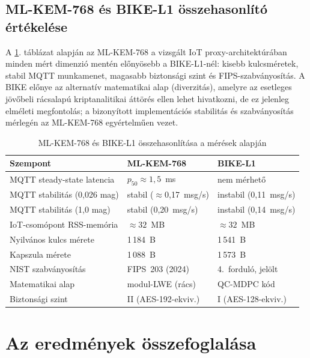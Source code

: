 \subsection{ML-KEM-768 és BIKE-L1 összehasonlító értékelése}

A \ref{tab:comparison}. táblázat alapján az ML-KEM-768 a vizsgált IoT proxy-architektúrában minden mért dimenzió
mentén előnyösebb a BIKE-L1-nél: kisebb kulcsméretek, stabil MQTT munkamenet, magasabb
biztonsági szint és FIPS-szabványosítás. A BIKE előnye az alternatív matematikai alap
(diverzitás), amelyre az esetleges jövőbeli rácsalapú kriptanalitikai áttörés ellen lehet
hivatkozni, de ez jelenleg elméleti megfontolás; a bizonyított implementációs stabilitás
és szabványosítás mérlegén az ML-KEM-768 egyértelműen vezet.

\begin{table}[H]
\centering
\caption{ML-KEM-768 és BIKE-L1 összehasonlítása a mérések alapján}
\label{tab:comparison}
\begin{tabular}{lll}
\hline
\textbf{Szempont}                & \textbf{ML-KEM-768}          & \textbf{BIKE-L1} \\
\hline
MQTT steady-state latencia       & $p_{50} \approx 1{,}5$~ms    & nem mérhető \\
MQTT stabilitás (0,026 mag)      & stabil ($\approx$0,17~msg/s) & instabil (0,11~msg/s) \\
MQTT stabilitás (1,0 mag)        & stabil (0,20~msg/s)          & instabil (0,14~msg/s) \\
IoT-csomópont RSS-memória        & $\approx 32$~MB              & $\approx 32$~MB \\
Nyilvános kulcs mérete           & 1\,184~B                     & 1\,541~B \\
Kapszula mérete                  & 1\,088~B                     & 1\,573~B \\
NIST szabványosítás              & FIPS~203 (2024)              & 4.\ forduló, jelölt \\
Matematikai alap                 & modul-LWE (rács)             & QC-MDPC kód \\
Biztonsági szint                 & II (AES-192-ekviv.)          & I (AES-128-ekviv.) \\
\hline
\end{tabular}
\end{table}

\section{Az eredmények összefoglalása}

